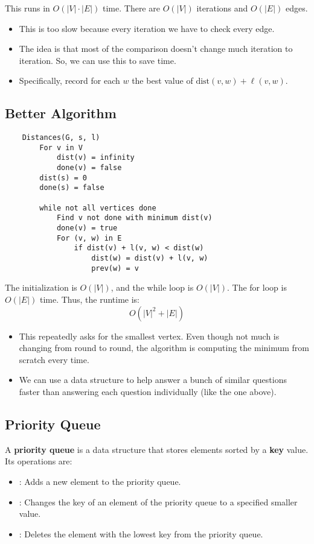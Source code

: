 \documentclass[letterpaper]{article}
\begin{document}
This runs in $O(|V| \cdot |E|)$ time. There are $O(|V|)$ iterations and $O(|E|)$ edges.
\begin{itemize}
    \item This is too slow because every iteration we have to check every edge. 
    \item The idea is that most of the comparison doesn't change much iteration to iteration. So, we can use this to save time. 
    \item Specifically, record for each $w$ the best value of $\text{dist}(v, w) + \ell(v, w)$. 
\end{itemize}

\subsection{Better Algorithm}
\begin{verbatim}
    Distances(G, s, l)
        For v in V 
            dist(v) = infinity 
            done(v) = false 
        dist(s) = 0
        done(s) = false 

        while not all vertices done 
            Find v not done with minimum dist(v)
            done(v) = true 
            For (v, w) in E 
                if dist(v) + l(v, w) < dist(w)
                    dist(w) = dist(v) + l(v, w)
                    prev(w) = v
\end{verbatim}
The initialization is $O(|V|)$, and the while loop is $O(|V|)$. The for loop is $O(|E|)$ time. Thus, the runtime is: 
\[O(|V|^2 + |E|)\]
\begin{itemize}
    \item This repeatedly asks for the smallest vertex. Even though not much is changing from round to round, the algorithm is computing the minimum from scratch every time.
    \item We can use a data structure to help answer a bunch of similar questions faster than answering each question individually (like the one above).
\end{itemize}

\subsection{Priority Queue}
A \textbf{priority queue} is a data structure that stores elements sorted by a \textbf{key} value. Its operations are: 
\begin{itemize}
    \item {}: Adds a new element to the priority queue.
    \item {}: Changes the key of an element of the priority queue to a specified smaller value. 
    \item {}: Deletes the element with the lowest key from the priority queue. 
\end{itemize}
\end{document}

